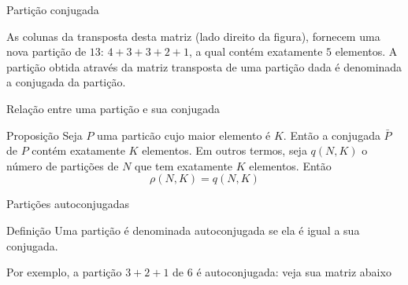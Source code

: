 \begin{frame}[fragile]{Partição conjugada}
\begin{figure}[!h]
\end{figure}

As colunas da transposta desta matriz (lado direito da figura),
fornecem uma nova partição de $13$: $4 + 3 + 3 + 2 + 1$, a qual contém exatamente
$5$ elementos. A partição obtida através da matriz transposta de uma partição dada é denominada
a conjugada da partição.

\end{frame}

\begin{frame}[fragile]{Relação entre uma partição e sua conjugada}

    \begin{block}{Proposição}
        Seja $P$ uma particão cujo maior elemento é $K$. Então a conjugada $\bar{P}$ de $P$ contém exatamente $K$ elementos. Em outros termos,
        seja $q(N, K)$ o número de partições de $N$ que tem exatamente $K$ elementos. Então
        \[
            \rho(N, K) = q(N, K)
        \]
    \end{block}

\end{frame}
\begin{frame}[fragile]{Partições autoconjugadas}

    \begin{block}{Definição}
        Uma partição é denominada autoconjugada se ela é igual a sua conjugada. 
    \end{block}

    \vspace{0.2in}

    Por exemplo, a partição $3 + 2 + 1$ de $6$ é autoconjugada: veja sua matriz abaixo

    \begin{figure}[!h]
        \centering

    \end{figure}

\end{frame}

